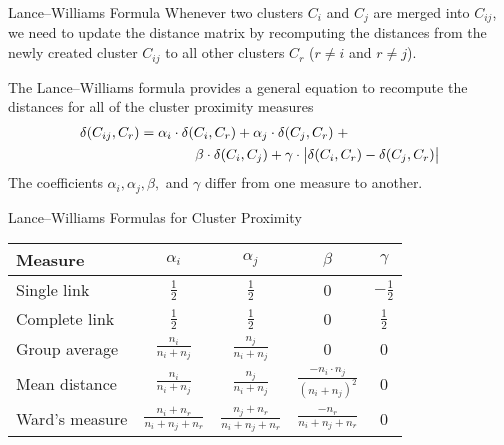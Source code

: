 \begin{frame}{Lance--Williams Formula}
Whenever two clusters $C_i$ and $C_{j}$ are merged into $C_{ij}$,
we need to update the distance matrix by recomputing the
distances from the newly created cluster $C_{ij}$ to all other
clusters $C_r$ ($r \ne i$ and $r \ne j$).

\medskip
The Lance--Williams formula provides a general equation to
recompute the distances for all of the cluster
proximity measures
\begin{align*}
    \delta(C_{ij},C_r) & =
        \alpha_i \cdot \delta(C_i,C_r) +
        \alpha_{j} \cdot \delta(C_{j},C_r)\; +\nonumber\\
        & \qquad \qquad \beta \cdot \delta(C_i,C_{j}) +
        \gamma \cdot \bigl|\delta(C_i,C_r)-\delta(C_{j},C_r)\bigr|
\end{align*}
The coeff\/{i}cients $\alpha_i, \alpha_{j}, \beta,$ {and} $\gamma$ differ from
one measure to another.
\end{frame}


\begin{frame}{Lance--Williams Formulas for Cluster Proximity}
\renewcommand{\arraystretch}{1.3}
\begin{center}
\begin{tabular}{|l|c|c|c|c|}
\hline
Measure & $\alpha_i$ & $\alpha_{j}$ & $\beta$ & $\gamma$ \\ \hline \hline
Single link   &  $\frac{1}{2}$ & $\frac{1}{2}$ & 0 & $-\frac{1}{2}$
\\ \hline
Complete link &  $\frac{1}{2}$ & $\frac{1}{2}$ & 0 & $\frac{1}{2}$
\\ \hline
Group average &  $\frac{n_i}{n_i+n_{j}}$ & $\frac{n_{j}}{n_i+n_{j}}$ &0&0
\\ \hline
Mean distance & $\frac{n_i}{n_i+n_{j}}$ &
$\frac{n_{j}}{n_i+n_{j}}$ &  $\frac{-n_i \cdot n_{j}}{(n_i+n_{j})^2}$ & 0
\\
\hline
Ward's measure        & $\frac{n_i+n_r}{n_i+n_{j}+n_r}$ &
$\frac{n_{j}+n_r}{n_i+n_{j}+n_r}$ &  $\frac{-n_r}{n_i+n_{j}+n_r}$ & 0 \\[2ex]
\hline
\end{tabular}
\end{center}
\end{frame}


